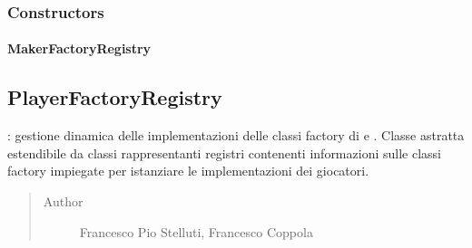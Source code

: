 \documentclass[letterpaper,10pt,italian,openany,oneside]{sphinxmanual}
\begin{document}
\subsubsection{Constructors}
\label{\detokenize{source/it/unicam/cs/pa/mastermind/players/MakerFactoryRegistry:constructors}}

\paragraph{MakerFactoryRegistry}
\label{\detokenize{source/it/unicam/cs/pa/mastermind/players/MakerFactoryRegistry:id1}}

\begin{fulllineitems}
\label{\detokenize{source/it/unicam/cs/pa/mastermind/players/MakerFactoryRegistry:it.unicam.cs.pa.mastermind.players.MakerFactoryRegistry.MakerFactoryRegistry(String)}}
\end{fulllineitems}



\subsection{PlayerFactoryRegistry}
\label{\detokenize{source/it/unicam/cs/pa/mastermind/players/PlayerFactoryRegistry:playerfactoryregistry}}\label{\detokenize{source/it/unicam/cs/pa/mastermind/players/PlayerFactoryRegistry::doc}}

\begin{fulllineitems}
\label{\detokenize{source/it/unicam/cs/pa/mastermind/players/PlayerFactoryRegistry:it.unicam.cs.pa.mastermind.players.PlayerFactoryRegistry}}
: gestione dinamica delle implementazioni delle classi factory di  e . Classe astratta estendibile da classi rappresentanti registri contenenti informazioni sulle classi factory impiegate per istanziare le implementazioni dei giocatori.
\begin{quote}\begin{description}
\item[{Author}] \leavevmode
Francesco Pio Stelluti, Francesco Coppola

\end{description}\end{quote}

\end{fulllineitems}
\end{document}
